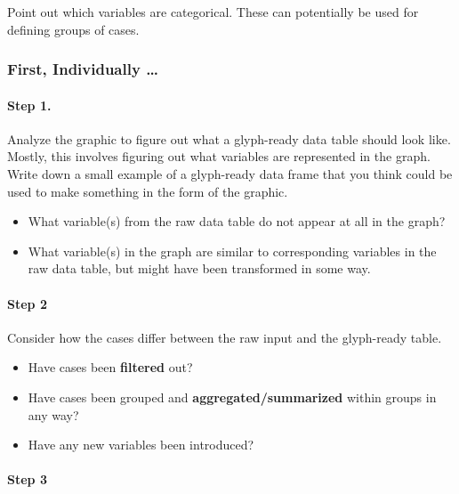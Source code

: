 \documentclass[]{article}
\begin{document}
\vspace*{1.5in}

Point out which variables are categorical. These can potentially be used
for defining groups of cases.

\subsubsection{First, Individually \ldots{}}\label{first-individually}

\paragraph{Step 1.}\label{step-1.}

Analyze the graphic to figure out what a glyph-ready data table should
look like. Mostly, this involves figuring out what variables are
represented in the graph. Write down a small example of a glyph-ready
data frame that you think could be used to make something in the form of
the graphic.

\vspace*{1.5in}

\begin{itemize}
\itemsep1pt\parskip0pt
\item
  What variable(s) from the raw data table do not appear at all in the
  graph?
\item
  What variable(s) in the graph are similar to corresponding variables
  in the raw data table, but might have been transformed in some way.
\end{itemize}

\paragraph{Step 2}\label{step-2}

Consider how the cases differ between the raw input and the glyph-ready
table.

\begin{itemize}
\itemsep1pt\parskip0pt
\item
  Have cases been \textbf{filtered} out?
\item
  Have cases been grouped and \textbf{aggregated/summarized} within
  groups in any way?
\item
  Have any new variables been introduced?
\end{itemize}

\paragraph{Step 3}\label{step-3}
\end{document}
